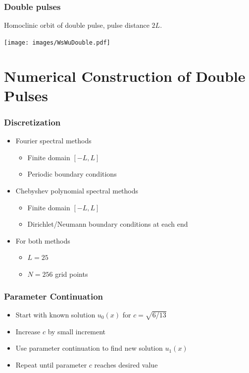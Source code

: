 \documentclass[16pt]{beamer}
\begin{document}
\begin{frame}
	\frametitle{Double pulses}
	\fontsize{16}{7.2}\selectfont
	Homoclinic orbit of double pulse, pulse distance $2L$.

	\begin{center}
		\texttt{[image: images/WsWuDouble.pdf]}
	\end{center}

\end{frame}

\section{Numerical Construction of Double Pulses}

\begin{frame}
	\frametitle{Discretization}
	\fontsize{16}{7.2}\selectfont
	\begin{itemize} 
		\item Fourier spectral methods
		\begin{itemize} 
			\item Finite domain $[-L, L]$
			\item Periodic boundary conditions
		\end{itemize}
		\item Chebyshev polynomial spectral methods
		\begin{itemize} 
			\item Finite domain $[-L, L]$
			\item Dirichlet/Neumann boundary conditions at each end
		\end{itemize}
		\item For both methods
		\begin{itemize} 
			\item $L = 25$ 
			\item $N = 256$ grid points
		\end{itemize}
	\end{itemize}
\end{frame}

\begin{frame}
	\frametitle{Parameter Continuation}
	\fontsize{14}{7.2}\selectfont
	\begin{itemize}
		\item Start with known solution $u_0(x)$ for $c = \sqrt{6/13}$
		\item Increase $c$ by small increment
		\item Use parameter continuation to find new solution $u_1(x)$
		\item Repeat until parameter $c$ reaches desired value 
	\end{itemize}
\end{frame}
\end{document}
